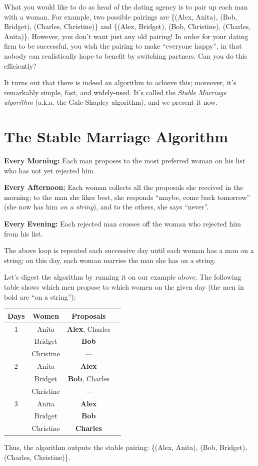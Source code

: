 \documentclass[11pt,fleqn]{article}
\newcounter{thm}
\begin{document}
What you would like to do as head of the dating agency is to pair up each man with a woman. For example, two possible pairings are \{(Alex, Anita), (Bob, Bridget), (Charles, Christine)\} and \{(Alex, Bridget), (Bob, Christine), (Charles, Anita)\}. However, you don't want just any old pairing! In order for your dating firm to be successful, you wish the pairing to make ``everyone happy'', in that nobody can realistically hope to benefit by switching partners. Can you do this efficiently?

It turns out that there is indeed an algorithm to achieve this; moreover, it's remarkably simple, fast, and widely-used. It's called the \emph{Stable Marriage algorithm} (a.k.a. the Gale-Shapley algorithm), and we present it now.

\section{The Stable Marriage Algorithm}\label{scn:alg}

\begin{framed}
  \noindent
  {\bf Every Morning:} Each man proposes to the most preferred woman on his list who has not yet rejected him.

  \noindent
  {\bf Every Afternoon:} Each woman collects all the proposals she received in the morning; to the man she likes best, she responds ``maybe, come back tomorrow'' (she now has him {\it on a string\/}), and to the others, she says ``never''.

  \noindent
  {\bf Every Evening:} Each rejected man crosses off the woman who rejected him
  from his list.

  The above loop is repeated each successive day until each woman has a man on a string; on this day, each woman marries the man she has on a string.
\end{framed}

Let's digest the algorithm by running it on our example above. The following table shows which men propose to
which women on the given day (the men in bold are ``on a string''):

\begin{center}
\begin{tabular}{|c|c|c|c|}
  \hline
  Days & Women & Proposals \\
  \hline
  1 & Anita & \textbf{Alex}, Charles \\
  &Bridget&\textbf{Bob}\\
  &Christine&---\\
  \hline
  2 & Anita & \textbf{Alex}\\
  &Bridget&\textbf{Bob}, Charles\\
  &Christine&---\\
  \hline
  3 & Anita & \textbf{Alex}\\
  &Bridget&\textbf{Bob}\\
  &Christine&\textbf{Charles}\\
  \hline
\end{tabular}
\end{center}
\noindent Thus, the algorithm outputs the stable pairing:
\{(Alex, Anita), (Bob, Bridget), (Charles, Christine)\}.
\end{document}
